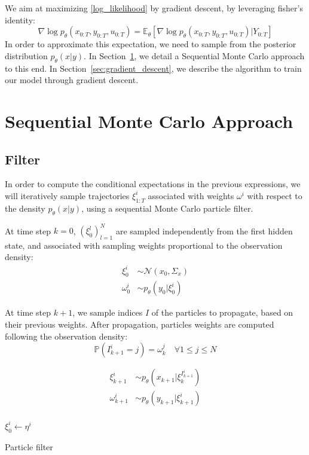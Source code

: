 \documentclass[10pt,a4paper]{report}
\begin{document}
We aim at maximizing \ref{log_likelihood} by gradient descent, by leveraging fisher's identity:
$$
	\nabla \log p_\theta(x_{0:T}, y_{0:T}, u_{0:T}) = \mathbb{E}_\theta \left[ \nabla\log p_\theta(x_{0:T}, y_{0:T}, u_{0:T}) | Y_{0:T} \right]
$$
In order to approximate this expectation, we need to sample from the posterior distribution $p_\theta(x|y)$.
In Section~\ref{sec:smc}, we detail a Sequential Monte Carlo approach to this end.
In Section~\ref{sec:gradient_descent}, we describe the algorithm to train our model through gradient descent.


\section{Sequential Monte Carlo Approach}
\label{sec:smc}

\subsection{Filter}
In order to compute the conditional expectations in the previous expressions, we will iteratively sample trajectories $\xi_{1:T}^i$ associated with weights $\omega^i$ with respect to the density $p_\theta(x | y)$, using a sequential Monte Carlo particle filter.

At time step $k=0$, $(\xi_0^l)_{l=1}^N$ are sampled independently from the first hidden state, and associated with sampling weights proportional to the observation density:
\begin{align*}
	\xi_0^i    & \sim \mathcal{N}(x_0, \Sigma_x) \\
	\omega_0^i & \sim p_\theta(y_0|\xi_0^i)
\end{align*}

At time step $k+1$, we sample indices $I$ of the particles to propagate, based on their previous weights.
After propagation, particles weights are computed following the observation density:
$$\mathbb{P}(I_{k+1}^i=j) = \omega_k^j \quad \forall 1 \leq j \leq N$$

\begin{align*}
	\xi_{k+1}^i    & \sim p_\theta(x_{k+1}|\xi_k^{I_{k+1}^i}) \\
	\omega_{k+1}^i & \sim p_\theta(y_{k+1}|\xi_{k+1}^i)       \\
\end{align*}

\begin{algorithm}
	$\xi_0^i \gets \eta^i$\;
	\caption{Particle filter}
\end{algorithm}
\end{document}
